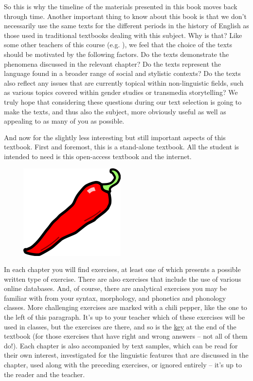So this is why the timeline of the materials presented in this book moves back through time. Another important thing to know about this book is that we don't necessarily use the same texts for the different periods in the history of English as those used in traditional textbooks dealing with this subject. Why is that? Like some other teachers of this course (e.g. \citealp[47]{Buck2003}), we feel that the choice of the texts should be motivated by the following factors. Do the texts demonstrate the phenomena discussed in the relevant chapter? Do the texts represent the language found in a broader range of social and stylistic contexts? Do the texts also reflect any issues that are currently topical within non-linguistic fields, such as various topics covered within gender studies or transmedia storytelling? We truly hope that considering these questions during our text selection is going to make the texts, and thus also the subject, more obviously useful as well as appealing to as many of you as possible.

And now for the slightly less interesting but still important aspects of this textbook. First and foremost, this is a stand-alone textbook. All the student is intended to need is this open-access textbook and the internet.

\begin{figure}
    \vspace{-10pt}
    \centering
    \includegraphics[scale=0.085]{chapters/img/chili.png}
\end{figure}

\noindent In each chapter you will find exercises, at least one of which presents a possible written type of exercise. There are also exercises that include the use of various online databases. And, of course, there are analytical exercises you may be familiar with from your syntax, morphology, and phonetics and phonology classes. More challenging exercises are marked with a chili pepper, like the one to the left of this paragraph. It's up to your teacher which of these exercises will be used in classes, but the exercises are there, and so is the \hyperref[answers]{key} at the end of the textbook (for those exercises that have right and wrong answers -- not all of them do!). Each chapter is also accompanied by text samples, which can be read for their own interest, investigated for the linguistic features that are discussed in the chapter, used along with the preceding exercises, or ignored entirely -- it's up to the reader and the teacher.

